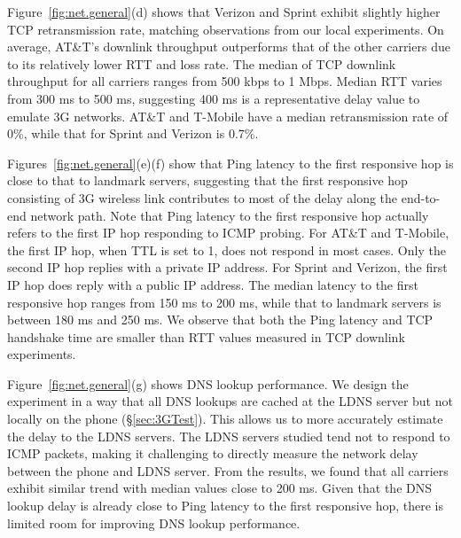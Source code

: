 Figure~\ref{fig:net.general}(d) shows that Verizon and Sprint exhibit
slightly higher TCP retransmission rate, matching observations from 
our local experiments. %
On average, AT\&T's downlink throughput outperforms that of the 
other carriers due to its relatively lower RTT and loss rate. The 
median of TCP downlink throughput for all carriers ranges from 500 
kbps to 1 Mbps. Median RTT varies from 300 ms to 500 ms, suggesting 
400 ms is a representative delay value to emulate 3G networks. AT\&T 
and T-Mobile have a median retransmission rate of 0\%, while that 
for Sprint and Verizon is 0.7\%.

Figures~\ref{fig:net.general}(e)(f) show that Ping latency to the 
first responsive hop is close to that to landmark servers, suggesting
that the first responsive hop consisting of 3G wireless link 
contributes to most of the delay along the end-to-end network path. 
Note that Ping latency to the first responsive hop actually refers 
to the first IP hop responding to ICMP probing. For AT\&T and 
T-Mobile, the first IP hop, when TTL is set to 1, does not respond
in most cases.
Only the second IP hop replies with a private IP address. For 
Sprint and Verizon, the first IP hop does reply with a public IP 
address. The median latency to the first responsive hop ranges 
from 150 ms to 200 ms, while that to landmark servers is between 
180 ms and 250 ms. We observe that both the Ping latency and TCP 
handshake time are smaller than RTT values measured in TCP downlink 
experiments. 


Figure~\ref{fig:net.general}(g) shows DNS lookup performance. We design 
the experiment in a way that all DNS lookups are cached at the LDNS 
server but not locally on the phone (\S\ref{sec:3GTest}). This allows 
us to more accurately estimate the delay to the LDNS servers. 
The LDNS servers studied tend not to respond to ICMP packets, making 
it challenging to directly measure the network delay between the 
phone and LDNS server. From the results, we found that all carriers 
exhibit similar trend with median values close to 200 ms. Given that 
the DNS lookup delay is already close to Ping latency to the first 
responsive hop, there is limited room for improving DNS lookup 
performance.

